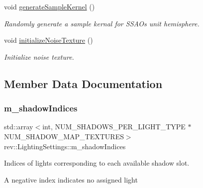 \begin{DoxyCompactItemize}
void \mbox{\hyperlink{classrev_1_1_lighting_settings_adf0d3516709226e6ddf1c2566beb0f58}{generate\+Sample\+Kernel}} ()
\begin{DoxyCompactList}\small\item\em Randomly generate a sample kernal for S\+S\+AO\textquotesingle{}s unit hemisphere. \end{DoxyCompactList}\item 
\mbox{\label{classrev_1_1_lighting_settings_a4601d6a9e08682e799e50fdfafff8921}} 
void \mbox{\hyperlink{classrev_1_1_lighting_settings_a4601d6a9e08682e799e50fdfafff8921}{initialize\+Noise\+Texture}} ()
\begin{DoxyCompactList}\small\item\em Initialize noise texture. \end{DoxyCompactList}\end{DoxyCompactItemize}


\subsection{Member Data Documentation}
\mbox{\label{classrev_1_1_lighting_settings_aa2e60999ab440042e19efbd3fd5fb8f4}} 
\subsubsection{\texorpdfstring{m\_shadowIndices}{m\_shadowIndices}}
{\footnotesize\ttfamily std\+::array$<$int, N\+U\+M\+\_\+\+S\+H\+A\+D\+O\+W\+S\+\_\+\+P\+E\+R\+\_\+\+L\+I\+G\+H\+T\+\_\+\+T\+Y\+PE $\ast$ N\+U\+M\+\_\+\+S\+H\+A\+D\+O\+W\+\_\+\+M\+A\+P\+\_\+\+T\+E\+X\+T\+U\+R\+ES$>$ rev\+::\+Lighting\+Settings\+::m\+\_\+shadow\+Indices\hspace{0.3cm}{\ttfamily [protected]}}



Indices of lights corresponding to each available shadow slot. 

A negative index indicates no assigned light \mbox{\label{classrev_1_1_lighting_settings_a9264e10cb4df67df2f04edd37dd87d25}} 
